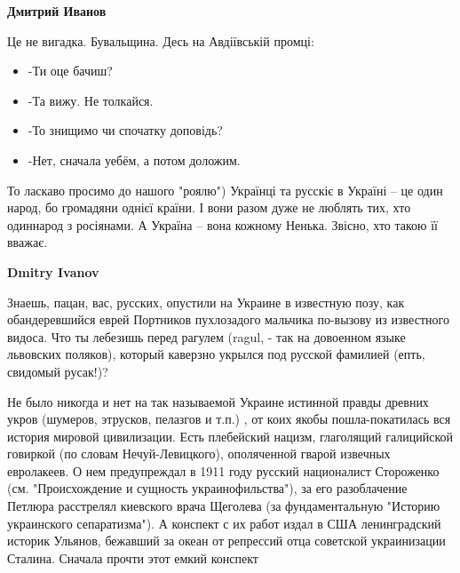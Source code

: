 \begin{itemize}
\begin{itemize}
 
\textbf{Дмитрий Иванов} 

Це не вигадка. Бувальщина.
Десь на Авдіївській промці:

\begin{itemize}
  \item -Ти оце бачиш?
  \item -Та вижу. Не толкайся.
  \item -То знищимо чи спочатку доповідь?
  \item -Нет, сначала уебём, а потом доложим.
\end{itemize}

То ласкаво просимо до нашого "роялю") Українці та русскіє в Україні – це один
народ, бо громадяни однієї країни. І вони разом дуже не люблять тих, хто
одиннарод з росіянами. А Україна – вона кожному Ненька. Звісно, хто такою її
вважає.

 

\textbf{Dmitry Ivanov} 

Знаешь, пацан, вас, русских, опустили на Украине в известную позу, как
обандеревшийся еврей Портников пухлозадого мальчика по-вызову из известного
видоса. Что ты лебезишь перед рагулем (ragul, - так на довоенном языке
львовских поляков), который каверзно укрылся под русской фамилией (епть,
свидомый русак!)? 

Не было никогда и нет на так называемой Украине истинной
правды древних укров (шумеров, этрусков, пелазгов и т.п.) , от коих якобы
пошла-покатилась вся история мировой цивилизации. Есть плебейский нацизм,
глаголящий галицийской говиркой (по словам Нечуй-Левицкого), ополяченной гварой
извечных евролакеев. О нем предупреждал в 1911 году русский националист
Стороженко (см. "Происхождение и сущность украинофильства"), за его
разоблачение Петлюра расстрелял киевского врача Щеголева (за фундаментальную
"Историю украинского сепаратизма"). А конспект с их работ издал в США
ленинградский историк Ульянов, бежавший за океан от репрессий отца советской
украинизации Сталина. Сначала прочти этот емкий конспект


\end{itemize}
\end{itemize}
